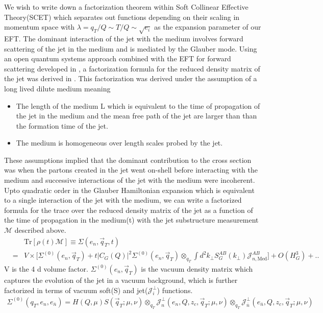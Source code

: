 \documentclass[letter,11pt]{article}
\newcommand{\nn}{\nonumber}
\newcommand{\bea}{\begin{eqnarray}}
\newcommand{\eea}{\end{eqnarray}}
\def\nn{\nonumber}
\begin{document}
We wish to write down a factorization theorem within Soft Collinear Effective Theory(SCET) which separates out functions depending on their scaling in momentum space with $ \lambda = q_T/Q \sim T/Q \sim \sqrt{e_i}$ as the expansion parameter of our EFT. 
The dominant interaction of the jet with the medium involves forward scattering of the jet in the medium and is mediated by the Glauber mode. Using an open quantum systems approach combined with the EFT for forward scattering developed in \cite{Rothstein:2016bsq}, a factorization formula for the reduced density matrix of the jet was derived in \cite{Vaidya:2020lih}. This factorization was derived under the assumption of a long lived dilute medium meaning
\begin{itemize}
\item
The length of the medium L which is equivalent to the time of propagation of the jet in the medium and the mean free path of the jet are larger than than the formation time of the jet.  
\item
The medium is homogeneous over length scales probed by the jet.
\end{itemize}
These assumptions implied that the dominant contribution to the cross section was when the partons created in the jet went on-shell before interacting with the medium and successive interactions of the jet with the medium were incoherent. 
Upto quadratic order in the Glauber Hamiltonian expansion which is equivalent to a single interaction of the jet with the medium, we can write a factorized formula for the trace over the reduced density matrix of the jet as a function of the time of propagation in the medium(t) with the jet substructure measurement $\mathcal{M}$ described above.
\bea
 &&\text{Tr}[\rho(t) \mathcal{M}]\equiv \Sigma(e_n,\vec{q}_T,t)\nn\\
&=& V\times \Bigg[\Sigma^{(0)}(e_n,\vec{q}_T)+ t |C_G(Q)|^2\Sigma^{(0)}(e_n,\vec{q}_T)\otimes_{q_T}\int d^2k_{\perp}S_G^{AB}(k_{\perp})\mathcal{J}_{n,\text{Med}}^{AB}\Bigg]+O(H_G^3)+..\nn
\label{Rho}
\eea 
V is the 4 d volume factor. $\Sigma^{(0)}(e_n,\vec{q}_T)$ is the vacuum density matrix which captures the evolution of the jet in a vacuum background, which is further factorized in terms of vacuum soft(S) and jet($\mathcal{J}_i^{\perp}$) functions.
\bea
\label{SigmZ}
\Sigma^{(0)}(q_T,e_n,e_{\bar n}) = H(Q,\mu)S(\vec{q}_T;\mu,\nu)\otimes_{q_T}\mathcal{J}^{\perp}_n(e_n,Q,z_{c},\vec{q}_T;\mu,\nu)\otimes_{q_T} \mathcal{J}^{\perp}_{\bar n}(e_{\bar n},Q,z_{c},\vec{q}_T;\mu,\nu)\nn\\
\eea
\end{document}
